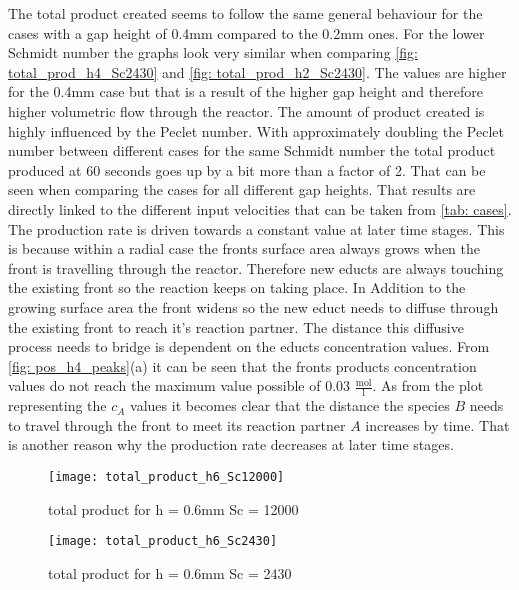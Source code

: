 \documentclass[../thesis.tex]{subfiles}
\begin{document}
The total product created seems to follow the same general behaviour for the cases with a gap height of 0.4mm compared to the 0.2mm ones. For the lower Schmidt number the graphs look very similar when comparing \autoref{fig: total_prod_h4_Sc2430} and \autoref{fig: total_prod_h2_Sc2430}. The values are higher for the 0.4mm case but that is a result of the higher gap height and therefore higher volumetric flow through the reactor. The amount of product created is highly influenced by the Peclet number. With approximately doubling the Peclet number between different cases for the same Schmidt number the total product produced at 60 seconds goes up by a bit more than a factor of 2. That can be seen when comparing the cases for all different gap heights. That results are directly linked to the different input velocities that can be taken from \autoref{tab: cases}. The production rate is driven towards a constant value at later time stages. This is because within a radial case the fronts surface area always grows when the front is travelling through the reactor. Therefore new educts are always touching the existing front so the reaction keeps on taking place. In Addition to the growing surface area the front widens so the new educt needs to diffuse through the existing front to reach it's reaction partner. The distance this diffusive process needs to bridge is dependent on the educts concentration values. From \autoref{fig: pos_h4_peaks}(a) it can be seen that the fronts products concentration values do not reach the maximum value possible of 0.03 $ \frac{\text{mol}}{\text{l}} $. As from the plot representing the $ c_A $ values it becomes clear that the distance the species $B$ needs to travel through the front to meet its reaction partner $A$ increases by time. That is another reason why the production rate decreases at later time stages.
\begin{figure}[htbp]
	\centering
	\texttt{[image: total\_product\_h6\_Sc12000]}
	\caption{total product for  h = 0.6mm Sc = 12000\label{fig: total_prod_h6_Sc12000}}\bigskip
	\texttt{[image: total\_product\_h6\_Sc2430]}
	\caption{total product for  h = 0.6mm Sc = 2430\label{fig: total_prod_h6_Sc2430}}
\end{figure}
\newline
\end{document}
